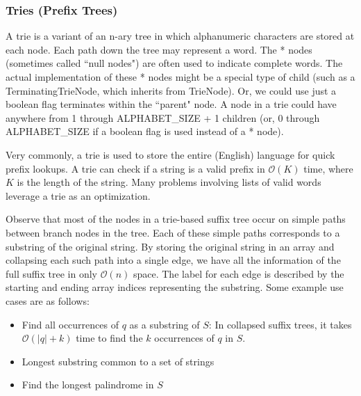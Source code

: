 \documentclass{article}
\newcommand{\bigO}{\ensuremath{\mathcal{O}}}
\begin{document}
    \subsubsection{Tries (Prefix Trees)}
    A trie is a variant of an n-ary tree in which alphanumeric characters are stored at each node. Each path down the tree may represent a word. The * nodes (sometimes called ``null nodes") are often used to indicate complete words. The actual implementation of these * nodes might be a special type of child (such as a TerminatingTrieNode, which inherits from TrieNode). Or, we could use just a boolean flag terminates within the ``parent" node. A node in a trie could have anywhere from 1 through ALPHABET\_SIZE + 1 children (or, 0 through ALPHABET\_SIZE if a boolean flag is used instead of a * node). 
    
    Very commonly, a trie is used to store the entire (English) language for quick prefix lookups.  A trie can check if a string is a valid prefix in $\bigO(K)$ time, where $K$ is the length of the string. Many problems involving lists of valid words leverage a trie as an optimization.
    
    Observe that most of the nodes in a trie-based suffix tree occur on simple paths between branch nodes in the tree. Each of these simple paths corresponds to a substring of the original string. By storing the original string in an array and collapsing each such path into a single edge, we have all the information of the full suffix tree in only $\bigO(n)$ space. The label for each edge is described by the starting and ending array indices representing the substring. Some example use cases are as follows:
    \begin{itemize}
        \item Find all occurrences of $q$ as a substring of $S$: In collapsed suffix trees, it takes $\bigO(|q| + k)$ time to find the $k$ occurrences of $q$ in $S$. 
        \item Longest substring common to a set of strings
        \item Find the longest palindrome in $S$
    \end{itemize}
 
\end{document}

